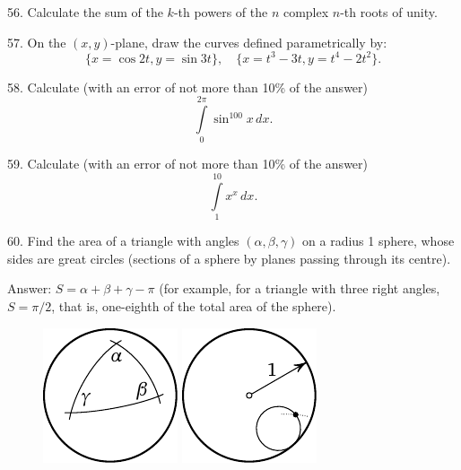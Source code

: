 \begin{problem}{56.}
	Calculate the sum of the $k$-th powers of the $n$ complex  $n$-th roots of unity.   
\end{problem}

\begin{problem}{57.}
	On the $(x,y)$-plane, draw the curves defined parametrically by: 
	\[
	\{x=\cos 2t, y=\sin 3t\},\quad 
	\{x=t^3-3t, y=t^4-2t^2\}.
	\]
\end{problem}

\begin{problem}{58.}
	Calculate (with an error of not more than 10\% of the answer)
	$$
	\int\limits_0^{2\pi} \sin^{100} x\,dx.
	$$
\end{problem}

\begin{problem}{59.}
	Calculate (with an error of not more than 10\% of the answer)
	$$
	\int\limits_1^{10} x^x\,dx.
	$$
\end{problem}

\begin{problem}{60.}
	Find the area of a triangle with angles $(\alpha, \beta, \gamma)$ on a radius 1 sphere,
	whose sides are great circles (sections of a sphere by planes passing through its centre).

	\medskip
	\begin{note}{Answer:}
		$S=\alpha+\beta+\gamma-\pi$ (for example, for a triangle with 
		three right angles, $S=\pi/2$, that is, one-eighth of the total area of the sphere).
		\begin{figure}[h]
		\centering
		 \includegraphics{taskbook-44}\hskip2cm \includegraphics{taskbook-45}
		\end{figure}
	\end{note}
\end{problem}

